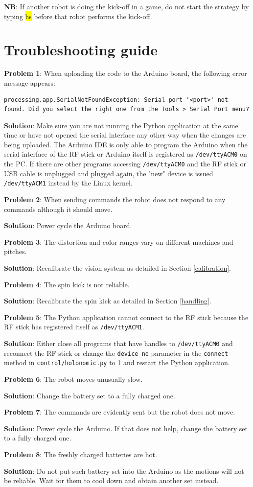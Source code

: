 \documentclass[a4paper,12pt]{article}
\newcommand{\hg}[1]{\hl{\ttfamily #1}}
\begin{document}
\textbf{NB}: If another robot is doing the kick-off in a game, do not start the strategy by typing \hg{hs} before that robot performs the kick-off.

\section{Troubleshooting guide}

\textbf{Problem 1}: When uploading the code to the Arduino board, the following error message appears:
\begin{lstlisting}
processing.app.SerialNotFoundException: Serial port '<port>' not found. Did you select the right one from the Tools > Serial Port menu?
\end{lstlisting}
\textbf{Solution}: Make sure you are not running the Python application at the same time or have not opened the serial interface any other way when the changes are being uploaded. The Arduino IDE is only able to program the Arduino when the serial interface of the RF stick or Arduino itself is registered as \texttt{/dev/ttyACM0} on the PC. If there are other programs accessing \texttt{/dev/ttyACM0} and the RF stick or USB cable is unplugged and plugged again, the "new" device is issued \texttt{/dev/ttyACM1} instead by the Linux kernel.

\textbf{Problem 2}: When sending commands the robot does not respond to any commands although it should move.

\textbf{Solution}: Power cycle the Arduino board.

\textbf{Problem 3}: The distortion and color ranges vary on different machines and pitches.

\textbf{Solution}: Recalibrate the vision system as detailed in Section \ref{calibration}.

\textbf{Problem 4}: The spin kick is not reliable.

\textbf{Solution}: Recalibrate the spin kick as detailed in Section \ref{handling}.

\textbf{Problem 5}: The Python application cannot connect to the RF stick because the RF stick has registered itself as \texttt{/dev/ttyACM1}.

\textbf{Solution}: Either close all programs that have handles to \texttt{/dev/ttyACM0} and reconnect the RF stick or change the \texttt{device\_no} parameter in the \texttt{connect} method in \texttt{control/holonomic.py} to 1 and restart the Python application.

\textbf{Problem 6}: The robot moves unusually slow.

\textbf{Solution}: Change the battery set to a fully charged one.

\textbf{Problem 7}: The commands are evidently sent but the robot does not move.

\textbf{Solution}: Power cycle the Arduino. If that does not help, change the battery set to a fully charged one.

\textbf{Problem 8}: The freshly charged batteries are hot.

\textbf{Solution}: Do not put such battery set into the Arduino as the motions will not be reliable. Wait for them to cool down and obtain another set instead.
\end{document}
